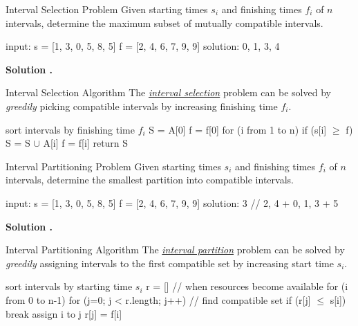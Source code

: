 \documentclass{cognito}
\begin{document}
\begin{note}{Interval Selection Problem}
	Given starting times $s_i$ and finishing times $f_i$ of $n$ intervals,
	determine the maximum subset of mutually compatible intervals.
	\begin{largecode}
 input: s = [1, 3, 0, 5, 8, 5]
        f = [2, 4, 6, 7, 9, 9]
 solution: {0, 1, 3, 4}
	\end{largecode}
	\bf Solution \hyperref[note:Interval Selection Algorithm]{\solutionref}.
\end{note}

\begin{note}{Interval Selection Algorithm}
	The \hyperref[note:Interval Selection Problem]{\it interval selection} problem can be solved by \emph{greedily}
	picking compatible intervals by increasing finishing time $f_i$.
	\begin{largecode}
 sort intervals by finishing time $f_i$
 S = {A[0]}
 f = f[0]
 for (i from 1 to n)
 	if (s[i] $\geq$ f)
		S = S $\cup$ {A[i]}
		f = f[i]
 return S
	\end{largecode}
	\vspace{-5pt}
\end{note}

\begin{note}{Interval Partitioning Problem}
	Given starting times $s_i$ and finishing times $f_i$ of $n$ intervals,
	determine the smallest partition into compatible intervals.
	\begin{largecode}
 input: s = [1, 3, 0, 5, 8, 5]
        f = [2, 4, 6, 7, 9, 9]
 solution: 3  // {2, 4} + {0, 1, 3} + {5}
	\end{largecode}
	\bf Solution \hyperref[note:Interval Partitioning Algorithm]{\solutionref}.
\end{note}

\begin{note}{Interval Partitioning Algorithm}
	The \hyperref[note:Interval Partitioning Problem]{\it interval partition} problem can be solved by \emph{greedily}
	assigning intervals to the first compatible set by increasing start time $s_i$.
	
	\begin{largecode}
 sort intervals by starting time $s_i$
 r = []  // when resources become available
 for (i from 0 to n-1)
	for (j=0; j < r.length; j++)  // find compatible set
		if (r[j] $\leq$ s[i]) break
	assign i to j
	r[j] = f[i]
	\end{largecode}
	\vspace{-5pt}
\end{note}
\end{document}
